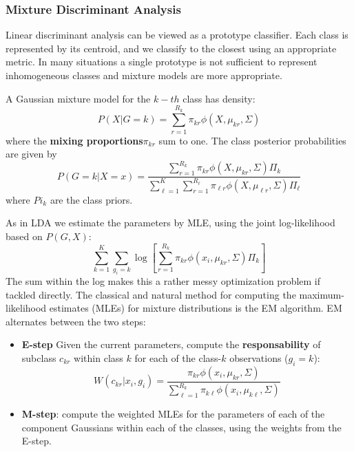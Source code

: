 \documentclass[12pt, letterpaper]{article}
\theoremstyle{definition}
\begin{document}
\subsubsection{Mixture Discriminant Analysis}
Linear discriminant analysis can be viewed as a prototype classifier. Each class is represented by its centroid, and we classify to the closest using an appropriate metric. In many situations a single prototype is not sufficient to represent inhomogeneous classes and mixture models are more appropriate.

A Gaussian mixture model for the $k-th$ class has density:
\begin{equation}
P(X|G=k) = \sum_{r=1}^{R_k} \pi_{kr}\phi(X, \mu_{kr},\Sigma)
\end{equation}
where the \textbf{mixing proportions}$\pi_{kr}$ sum to one. The class posterior probabilities are given by
\begin{equation}
P(G=k|X=x) = \frac{\sum_{r=1}^{R_k} \pi_{kr}\phi(X, \mu_{kr},\Sigma)\Pi_k}{\sum_{\ell=1}^K\sum_{r=1}^{R_\ell} \pi_{\ell r}\phi(X, \mu_{\ell r},\Sigma)\Pi_\ell}
\end{equation}
where $Pi_k$ are the class priors.

As in LDA we estimate the parameters by MLE, using the joint log-likelihood based on $P(G,X)$:
\begin{equation}
\sum_{k=1}^K\sum_{g_i=k} \log \left[ \sum_{r=1}^{R_k} \pi_{k r} \phi (x_i,\mu_{k r}, \Sigma)\Pi_k\right]
\end{equation}
The sum within the log makes this a rather messy optimization problem if tackled directly. The classical and natural method for computing the maximum-likelihood estimates (MLEs) for mixture distributions is the EM algorithm. EM alternates between the two steps:
\begin{itemize}
\item \textbf{E-step} Given the current parameters, compute the \textbf{responsability} of subclass $c_{kr}$ within class $k$ for each of the class-$k$ observations ($g_i=k$):
\begin{equation}
W(c_{kr}|x_i, g_i) = \frac{ \pi_{kr}\phi(x_i, \mu_{kr},\Sigma)}{\sum_{\ell=1}^{R_k} \pi_{k \ell}\phi(x_i, \mu_{k \ell},\Sigma)}
\end{equation}
\item \textbf{M-step}: compute the weighted MLEs for the parameters of each of the component Gaussians within each of the classes, using the weights from the E-step.
\end{itemize}
\end{document}
